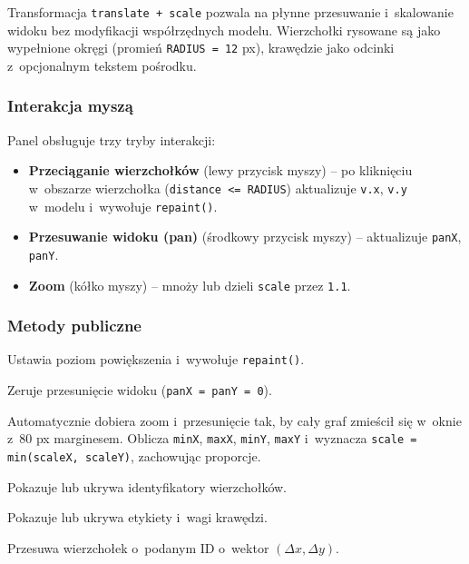 \documentclass[12pt]{article}
\begin{document}
Transformacja \texttt{translate + scale} pozwala na płynne przesuwanie
i~skalowanie widoku bez modyfikacji współrzędnych modelu. Wierzchołki
rysowane są jako wypełnione okręgi (promień \texttt{RADIUS = 12} px),
krawędzie jako odcinki z~opcjonalnym tekstem pośrodku.

\subsubsection{Interakcja myszą}

Panel obsługuje trzy tryby interakcji:
\begin{itemize}
    \item \textbf{Przeciąganie wierzchołków} (lewy przycisk myszy) --
          po kliknięciu w~obszarze wierzchołka (\texttt{distance <= RADIUS})
          aktualizuje \texttt{v.x}, \texttt{v.y} w~modelu i~wywołuje
          \texttt{repaint()}.
    \item \textbf{Przesuwanie widoku (pan)} (środkowy przycisk myszy) --
          aktualizuje \texttt{panX}, \texttt{panY}.
    \item \textbf{Zoom} (kółko myszy) -- mnoży lub dzieli \texttt{scale}
          przez \texttt{1.1}.
\end{itemize}

\subsubsection{Metody publiczne}

\begin{description}[leftmargin=5cm, style=nextline]
    \item[\texttt{setZoom(double)}] Ustawia poziom powiększenia i~wywołuje
         \texttt{repaint()}.
    \item[\texttt{resetView()}] Zeruje przesunięcie widoku (\texttt{panX = panY = 0}).
    \item[\texttt{fitToView()}] Automatycznie dobiera zoom i~przesunięcie tak,
         by cały graf zmieścił się w~oknie z~80 px marginesem. Oblicza
         \texttt{minX}, \texttt{maxX}, \texttt{minY}, \texttt{maxY} i~wyznacza
         \texttt{scale = min(scaleX, scaleY)}, zachowując proporcje.
    \item[\texttt{setShowVertexDecorators(boolean)}] Pokazuje lub ukrywa
         identyfikatory wierzchołków.
    \item[\texttt{setShowEdgeDecorators(boolean)}] Pokazuje lub ukrywa
         etykiety i~wagi krawędzi.
    \item[\texttt{moveVertex(int id, double dx, double dy)}] Przesuwa wierzchołek
         o~podanym ID o~wektor $(\Delta x, \Delta y)$.
\end{description}
\end{document}
